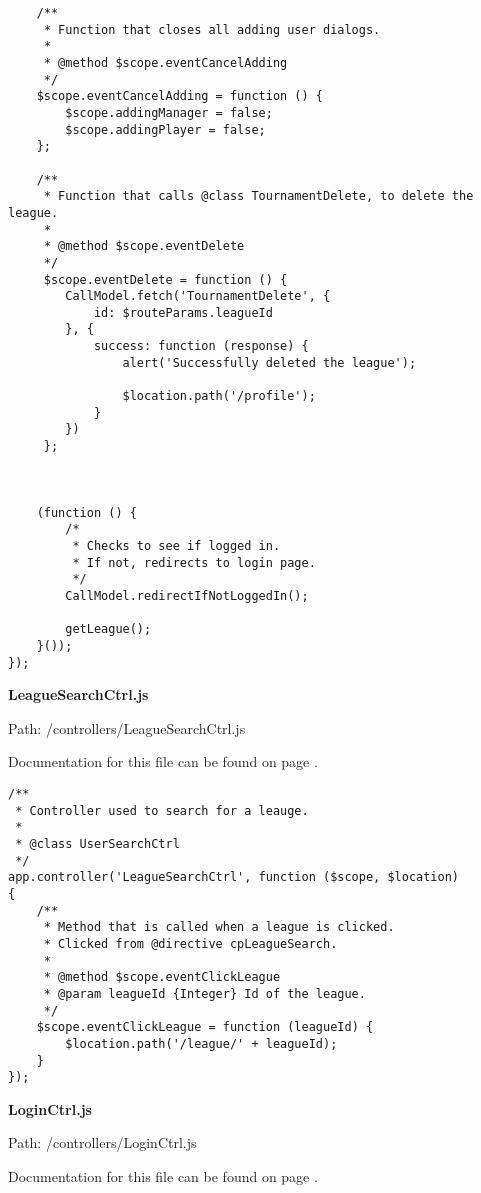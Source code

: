 {\begin{lstlisting}
	/**
	 * Function that closes all adding user dialogs.
	 *
	 * @method $scope.eventCancelAdding
	 */
	$scope.eventCancelAdding = function () {
		$scope.addingManager = false;
		$scope.addingPlayer = false;
	};

	/**
	 * Function that calls @class TournamentDelete, to delete the league.
	 *
	 * @method $scope.eventDelete
	 */
	 $scope.eventDelete = function () {
	 	CallModel.fetch('TournamentDelete', {
	 		id: $routeParams.leagueId
	 	}, {
	 		success: function (response) {
	 			alert('Successfully deleted the league');

	 			$location.path('/profile');
	 		}
	 	})
	 };



	(function () {
		/* 
		 * Checks to see if logged in.
		 * If not, redirects to login page.
		 */
		CallModel.redirectIfNotLoggedIn();

		getLeague();
	}());
});\end{lstlisting}
}
\textbf{LeagueSearchCtrl.js}\label{LeagueSearchCtrl.js}

Path: /controllers/LeagueSearchCtrl.js

Documentation for this file can be found on page \pageref{LeagueSearchCtrl.js.doc}.

{\scriptsize
\begin{lstlisting}
/**
 * Controller used to search for a leauge.
 *
 * @class UserSearchCtrl
 */
app.controller('LeagueSearchCtrl', function ($scope, $location)
{
	/**
	 * Method that is called when a league is clicked.
	 * Clicked from @directive cpLeagueSearch.
	 *
	 * @method $scope.eventClickLeague
	 * @param leagueId {Integer} Id of the league.
	 */
	$scope.eventClickLeague = function (leagueId) {
		$location.path('/league/' + leagueId);
	}
});\end{lstlisting}
}
\textbf{LoginCtrl.js}\label{LoginCtrl.js}

Path: /controllers/LoginCtrl.js

Documentation for this file can be found on page \pageref{LoginCtrl.js.doc}.

